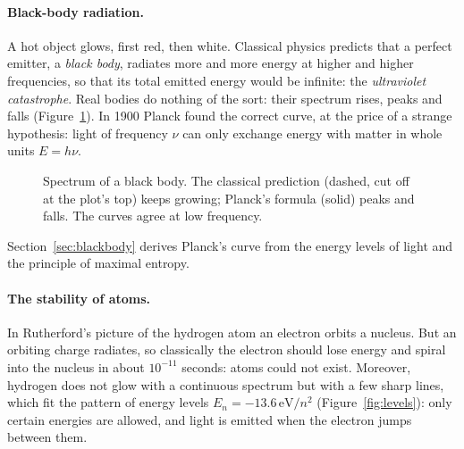 \paragraph{Black-body radiation.}
A hot object glows, first red, then white. Classical physics predicts that a perfect emitter, a \emph{black body}, radiates more and more energy at higher and higher frequencies, so that its total emitted energy would be infinite: the \emph{ultraviolet catastrophe}. Real bodies do nothing of the sort: their spectrum rises, peaks and falls (Figure~\ref{fig:blackbody}). In 1900 Planck found the correct curve, at the price of a strange hypothesis: light of frequency $\nu$ can only exchange energy with matter in whole units $E=h\nu$.

\begin{figure}[htb]
  \centering
  \caption{Spectrum of a black body. The classical prediction (dashed, cut off at the plot's top) keeps growing; Planck's formula (solid) peaks and falls. The curves agree at low frequency.}
  \label{fig:blackbody}
\end{figure}

Section~\ref{sec:blackbody} derives Planck's curve from the energy levels of light and the principle of maximal entropy.

\paragraph{The stability of atoms.}
In Rutherford's picture of the hydrogen atom an electron orbits a nucleus. But an orbiting charge radiates, so classically the electron should lose energy and spiral into the nucleus in about $10^{-11}$ seconds: atoms could not exist. Moreover, hydrogen does not glow with a continuous spectrum but with a few sharp lines, which fit the pattern of energy levels $E_n=-13.6\,\mathrm{eV}/n^2$ (Figure~\ref{fig:levels}): only certain energies are allowed, and light is emitted when the electron jumps between them.

